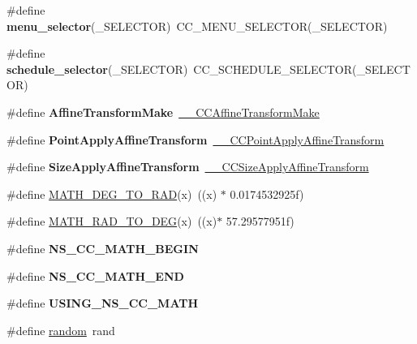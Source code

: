 \begin{DoxyCompactItemize}
\item 
\mbox{\label{group__base_gaaf4135f283ffa04049acdd0d98ced399}} 
\#define {\bfseries menu\+\_\+selector}(\+\_\+\+S\+E\+L\+E\+C\+T\+OR)~C\+C\+\_\+\+M\+E\+N\+U\+\_\+\+S\+E\+L\+E\+C\+T\+OR(\+\_\+\+S\+E\+L\+E\+C\+T\+OR)
\item 
\mbox{\label{group__base_ga32d629acb8d8cbd2fdb9bf98f45736b7}} 
\#define {\bfseries schedule\+\_\+selector}(\+\_\+\+S\+E\+L\+E\+C\+T\+OR)~C\+C\+\_\+\+S\+C\+H\+E\+D\+U\+L\+E\+\_\+\+S\+E\+L\+E\+C\+T\+OR(\+\_\+\+S\+E\+L\+E\+C\+T\+OR)
\item 
\mbox{\label{group__base_ga6f5f5e63a840aa04d1d728fd57e4bfcc}} 
\#define {\bfseries Affine\+Transform\+Make}~\hyperlink{group__base_ga6512cedee05a78771b7aac4e4d57a499}{\+\_\+\+\_\+\+C\+C\+Affine\+Transform\+Make}
\item 
\mbox{\label{group__base_gacaf876df474d9bf68df41235654bec40}} 
\#define {\bfseries Point\+Apply\+Affine\+Transform}~\hyperlink{group__base_ga925cec1fb977da8fb3d8280ba82cc5c7}{\+\_\+\+\_\+\+C\+C\+Point\+Apply\+Affine\+Transform}
\item 
\mbox{\label{group__base_gab1d40a014c106f103aa32191e9541978}} 
\#define {\bfseries Size\+Apply\+Affine\+Transform}~\hyperlink{group__base_ga40f990327de656e394d23b0650208008}{\+\_\+\+\_\+\+C\+C\+Size\+Apply\+Affine\+Transform}
\item 
\#define \hyperlink{group__base_gae2eab65745e7f093a97fbd4421261c84}{M\+A\+T\+H\+\_\+\+D\+E\+G\+\_\+\+T\+O\+\_\+\+R\+AD}(x)~((x) $\ast$ 0.\+0174532925f)
\item 
\#define \hyperlink{group__base_ga7144cae826260514e7a61f405c77e848}{M\+A\+T\+H\+\_\+\+R\+A\+D\+\_\+\+T\+O\+\_\+\+D\+EG}(x)~((x)$\ast$ 57.\+29577951f)
\item 
\mbox{\label{group__base_gaf66fbc3024a6ebf672e9270a52970aab}} 
\#define {\bfseries N\+S\+\_\+\+C\+C\+\_\+\+M\+A\+T\+H\+\_\+\+B\+E\+G\+IN}
\item 
\mbox{\label{group__base_gab9bcf41ee04aab8263ce6821976c3908}} 
\#define {\bfseries N\+S\+\_\+\+C\+C\+\_\+\+M\+A\+T\+H\+\_\+\+E\+ND}
\item 
\mbox{\label{group__base_ga816286195c50ca639ce83faf755c20ef}} 
\#define {\bfseries U\+S\+I\+N\+G\+\_\+\+N\+S\+\_\+\+C\+C\+\_\+\+M\+A\+TH}
\item 
\#define \hyperlink{group__base_gae4ebe0d1812bb378ab3531d81d9856b8}{random}~rand
\end{DoxyCompactItemize}
